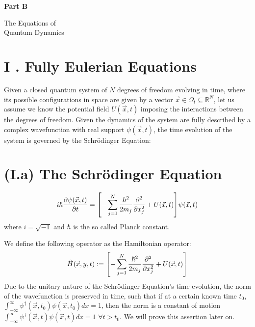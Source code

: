 \documentclass[11pt, a4paper]{article} %
\newcommand{\R}{\mathbb{R}} %
\newenvironment{kapituloBerria}[1][]
  {\clearpage           %
   \thispagestyle{empty}%
   \vspace*{\stretch{2}}%
   \raggedleft          %
   {\textbf{{\fontsize{60}{40}\selectfont \hspace{+9.5cm}#1\newline \newline}}}
   \bf
   \fontsize{30}{20}\selectfont
  }
  {\par %
   \vspace{\stretch{3}} %
   \clearpage           %
  }
\begin{document}
\newpage
\null
\clearpage

\begin{kapituloBerria}[Part B]
The Equations of\\ Quantum Dynamics
\end{kapituloBerria}
\newpage
\null
\clearpage
{}

\section*{I . Fully Eulerian Equations}
Given a closed quantum system of $N$ degrees of freedom evolving in time, where its possible configurations in space are given by a vector $\vec{x}\in\Omega_t\subseteq\R^N$, let us assume we know the potential field $U(\vec{x}, t)$ imposing the interactions between the degrees of freedom. Given the dynamics of the system are fully described by a complex wavefunction with real support $\psi(\vec{x},t)$, the time evolution of the system is governed by the Schrödinger Equation:

\section*{(I.a) The Schrödinger Equation}
\begin{equation}\label{SE}
i\hbar \pdv{\psi(\vec{x},t)}{t} = \qty[-\sum_{j=1}^N\frac{\hbar^2}{2m_j}\pdv[2]{}{x_j} + U(\vec{x},t)]\psi(\vec{x},t)
\end{equation}
where $i=\sqrt{-1}$ and $\hbar$ is the so called Planck constant.

We define the following operator as the Hamiltonian operator:
\begin{equation}
\hat{H}(\vec{x}, y, t):=\qty[-\sum_{j=1}^N\frac{\hbar^2}{2m_j}\pdv[2]{}{x_j} + U(\vec{x},t)]
\end{equation}
Due to the unitary nature of the Schrödinger Equation's time evolution, the norm of the wavefunction is preserved in time, such that if at a certain known time $t_0$, $\int^\infty_{-\infty} \psi^\dagger(\vec{x},t_0)\psi(\vec{x},t_0)dx=1$, then the norm is a constant of motion $\int^\infty_{-\infty} \psi^\dagger(\vec{x},t)\psi(\vec{x},t)dx=1$ $\forall t>t_0$. We will prove this assertion later on.
\end{document}
